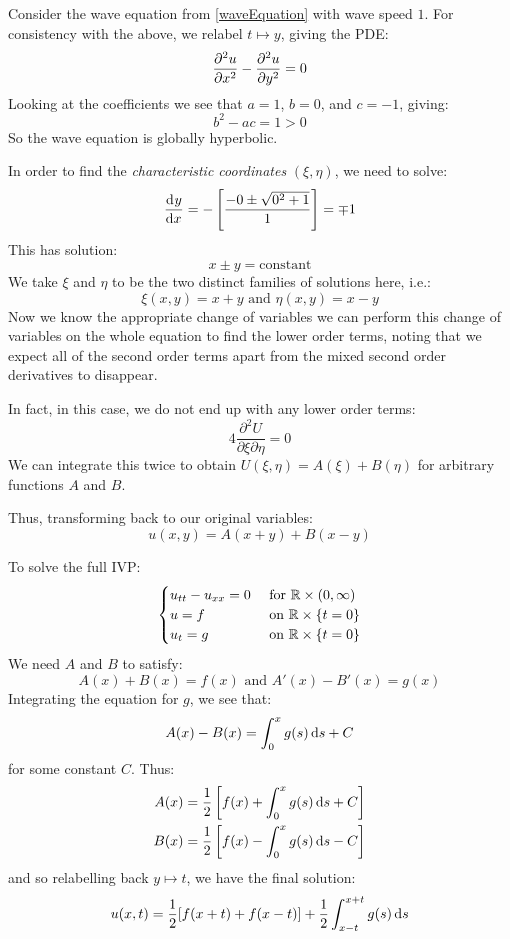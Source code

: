 \documentclass[../main.tex]{subfiles}
\begin{document}
\begin{example}
  Consider the wave equation from \cref{waveEquation} with wave speed $1$.
  For consistency with the above, we relabel $t \mapsto y$, giving the PDE:
  \[
    \pderiv[2]{u}{x} - \pderiv[2]{u}{y} = 0
  \]
  Looking at the coefficients we see that $a = 1$, $b = 0$, and $c = -1$, giving:
  \[
    b^2 - ac = 1 > 0
  \]
  So the wave equation is globally hyperbolic.

  In order to find the \textit{characteristic coordinates} $(\xi, \eta)$, we need to solve:
  \[
    \deriv{y}{x} = -\left[\frac{-0 \pm \sqrt{0^2 + 1}}{1}\right] = \mp 1
  \]
  This has solution:
  \[
    x \pm y = \text{constant}
  \]
  We take $\xi$ and $\eta$ to be the two distinct families of solutions here, i.e.:
  \[
    \xi(x, y) = x + y \text{ and } \eta(x, y) = x - y
  \]
  Now we know the appropriate change of variables we can perform this change of variables on the whole equation to find the lower order terms, noting that we expect all of the second order terms apart from the mixed second order derivatives to disappear.

  In fact, in this case, we do not end up with any lower order terms:
  \[
    4 \frac{\partial^2 U}{\partial \xi \partial \eta} = 0
  \]
  We can integrate this twice to obtain $U(\xi, \eta) = A(\xi) + B(\eta)$ for arbitrary functions $A$ and $B$.

  Thus, transforming back to our original variables:
  \[
    u(x, y) = A(x + y) + B(x - y)
  \]

  To solve the full IVP:
  \[
    \begin{cases}
    u_{t t} - u_{x x} = 0 & \text{ for } \mathbb{R} \times (0, \infty) \\
    u = f & \text{ on } \mathbb{R} \times \{t = 0\} \\
    u_{t} = g & \text{ on } \mathbb{R} \times \{t = 0\}
    \end{cases}
  \]
  We need $A$ and $B$ to satisfy:
  \[
    A(x) + B(x) = f(x) \text{ and } A'(x) - B'(x) = g(x)
  \]
  Integrating the equation for $g$, we see that:
  \[
    A(x) - B(x) = \int_{0}^{x} g(s) \d{s} + C
  \]
  for some constant $C$.
  Thus:
  \begin{align*}
    A(x) &= \frac{1}{2}\left[f(x) + \int_{0}^{x} g(s) \d{s} + C\right] \\
    B(x) &= \frac{1}{2}\left[f(x) - \int_{0}^{x} g(s) \d{s} - C\right] \\
  \end{align*}
  and so relabelling back $y \mapsto t$, we have the final solution:
  \[
    u(x, t) = \frac{1}{2}[f(x + t) + f(x - t)] + \frac{1}{2} \int_{x - t}^{x + t} g(s) \d{s}
  \]
\end{example}
\end{document}
